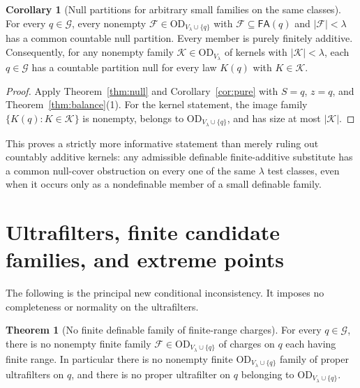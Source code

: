 \documentclass[11pt,letterpaper]{article}
\theoremstyle{definition}
\newtheorem{theorem}[definition]{Theorem}
\newtheorem{corollary}[definition]{Corollary}
\newcommand{\OD}{\mathrm{OD}}
\newcommand{\FA}{\mathsf{FA}}
\newcommand{\ODlam}{\OD_{V_\lambda}}
\newcommand{\ODq}{\OD_{V_\lambda\cup\{q\}}}
\begin{document}
\begin{corollary}[Null partitions for arbitrary small families on the same classes]\label{cor:localnull}
For every $q\in\mathcal G$, every nonempty $\mathcal F\in\ODq$ with $\mathcal F\subseteq\FA(q)$ and $|\mathcal F|<\lambda$ has a common countable null partition. Every member is purely finitely additive. Consequently, for any nonempty family $\mathscr K\in\ODlam$ of kernels with $|\mathscr K|<\lambda$, each $q\in\mathcal G$ has a countable partition null for every law $K(q)$ with $K\in\mathscr K$.
\end{corollary}

\begin{proof}
Apply Theorem~\ref{thm:null} and Corollary~\ref{cor:pure} with $S=q$, $z=q$, and Theorem~\ref{thm:balance}(1). For the kernel statement, the image family $\{K(q):K\in\mathscr K\}$ is nonempty, belongs to $\ODq$, and has size at most $|\mathscr K|$.
\end{proof}

This proves a strictly more informative statement than merely ruling out countably additive kernels: any admissible definable finite-additive substitute has a common null-cover obstruction on every one of the same $\lambda$ test classes, even when it occurs only as a nondefinable member of a small definable family.

\section{Ultrafilters, finite candidate families, and extreme points}\label{sec:extreme}

The following is the principal new conditional inconsistency. It imposes no completeness or normality on the ultrafilters.

\begin{theorem}[No finite definable family of finite-range charges]\label{thm:finitefamily}
For every $q\in\mathcal G$, there is no nonempty finite family $\mathcal F\in\ODq$ of charges on $q$ each having finite range. In particular there is no nonempty finite $\ODq$ family of proper ultrafilters on $q$, and there is no proper ultrafilter on $q$ belonging to $\ODq$.
\end{theorem}
\end{document}
